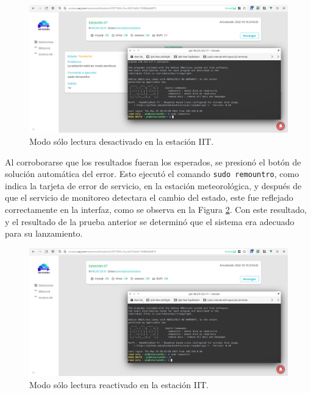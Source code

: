 \begin{figure}[!ht]
	\centering
	\includegraphics[width=1\linewidth]{images/screenshots/0.1.4-iit-ropi-disabled.png}
	\caption{Modo sólo lectura desactivado en la estación IIT.}
	\label{fig:iit-ropi-disabled}
\end{figure}

Al corroborarse que los resultados fueran los esperados, se presionó el botón de solución automática del error. Esto ejecutó el comando \texttt{sudo remountro}, como indica la tarjeta de error de servicio, en la estación meteorológica, y después de que el servicio de monitoreo detectara el cambio del estado, este fue reflejado correctamente en la interfaz, como se observa en la Figura \ref{fig:iit-ropi-fixed}. Con este resultado, y el resultado de la prueba anterior se determinó que el sistema era adecuado para su lanzamiento.

\begin{figure}[!ht]
	\centering
	\includegraphics[width=1\linewidth]{images/screenshots/0.1.5-iit-ropi-fixed.png}
	\caption{Modo sólo lectura reactivado en la estación IIT.}
	\label{fig:iit-ropi-fixed}
\end{figure}




